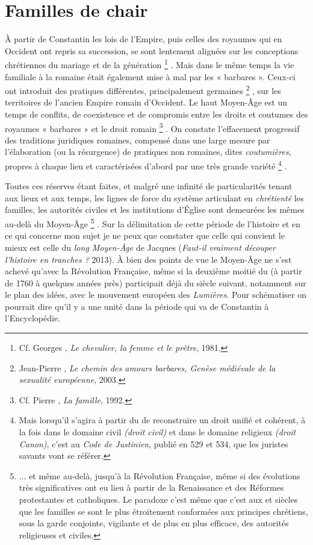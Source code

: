 
\chapter{Familles de chair}


 À partir de Constantin les lois de l'Empire, puis celles des royaumes qui en Occident ont repris sa succession, se sont lentement alignées sur les conceptions chrétiennes du mariage et de la génération%
\footnote{Cf. Georges , \emph{Le chevalier, la femme et le prêtre}, 1981.}%
. Mais dans le même temps la vie familiale à la romaine était également mise à mal par les « barbares ». Ceux-ci ont introduit des pratiques différentes, principalement germaines%
\footnote{Jean-Pierre , \emph{Le chemin des amours barbares, Genèse médiévale de la sexualité européenne}, 2003.}%
, sur les territoires de l'ancien Empire romain d'Occident. Le haut Moyen-Âge est un temps de conflits, de coexistence et de compromis entre les droits et coutumes des royaumes « barbares » et le droit romain%
\footnote{Cf. Pierre , \emph{La famille}, 1992.}%
. On constate l'effacement progressif des traditions juridiques romaines, compensé dans une large mesure par l'élaboration (ou la résurgence) de pratiques non romaines, dites \emph{coutumières}, propres à chaque lieu et caractérisées d'abord par une très grande variété%
\footnote{Mais lorsqu'il s'agira à partir du  de reconstruire un droit unifié et cohérent, à la fois dans le domaine civil \emph{(droit civil)} et dans le domaine religieux \emph{(droit Canon)}, c'est au \emph{Code de Justinien}, publié en 529 et 534, que les juristes savants vont se référer.}%
. 

 Toutes ces réserves étant faites, et malgré une infinité de particularités tenant aux lieux et aux temps, les lignes de force du système articulant en \emph{chrétienté} les familles, les autorités civiles et les institutions d'Église sont demeurées les mêmes au-delà du Moyen-Âge%
\footnote{... et même au-delà, jusqu'à la Révolution Française, même si des évolutions très significatives ont eu lieu à partir de la Renaissance et des Réformes protestantes et catholiques. Le paradoxe c'est même que c'est aux  et  siècles que les familles se sont le plus étroitement conformées aux principes chrétiens, sous la garde conjointe, vigilante et de plus en plus efficace, des autorités religieuses et civiles.}%
. Sur la délimitation de cette période de l'histoire et en ce qui concerne mon sujet je ne peux que constater que celle qui convient le mieux est celle du \emph{long Moyen-Âge} de Jacques  (\emph{Faut-il vraiment découper l'histoire en tranches ?} 2013). À bien des points de vue le Moyen-Âge ne s'est achevé qu'avec la Révolution Française, même si la deuxième moitié du  (à partir de 1760 à quelques années près) participait déjà du siècle suivant, notamment sur le plan des idées, avec le mouvement européen des \emph{Lumières}. Pour schématiser on pourrait dire qu'il y a une unité dans la période qui va de Constantin à l'Encyclopédie. 

